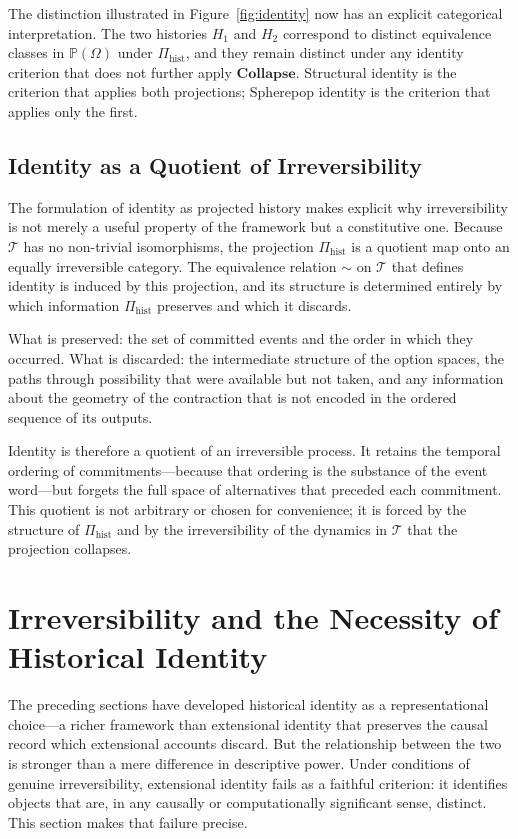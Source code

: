 \documentclass[12pt]{article}
\theoremstyle{plain}
\theoremstyle{definition}
\theoremstyle{remark}
\newcommand{\Collapse}{\mathbf{Collapse}}
\newcommand{\PathCat}{\mathbb{P}(\Omega)}
\begin{document}
The distinction illustrated in Figure~\ref{fig:identity} now has an explicit
categorical interpretation.  The two histories $H_1$ and $H_2$ correspond to
distinct equivalence classes in $\PathCat$ under $\Pi_{\mathrm{hist}}$, and they
remain distinct under any identity criterion that does not further apply
$\Collapse$.  Structural identity is the criterion that applies both projections;
Spherepop identity is the criterion that applies only the first.

\subsection{Identity as a Quotient of Irreversibility}

The formulation of identity as projected history makes explicit why
irreversibility is not merely a useful property of the framework but a
constitutive one.  Because $\mathcal{T}$ has no non-trivial isomorphisms, the
projection $\Pi_{\mathrm{hist}}$ is a quotient map onto an equally irreversible
category.  The equivalence relation $\sim$ on $\mathcal{T}$ that defines
identity is induced by this projection, and its structure is determined entirely
by which information $\Pi_{\mathrm{hist}}$ preserves and which it discards.

What is preserved: the set of committed events and the order in which they
occurred.  What is discarded: the intermediate structure of the option spaces,
the paths through possibility that were available but not taken, and any
information about the geometry of the contraction that is not encoded in the
ordered sequence of its outputs.

Identity is therefore a quotient of an irreversible process.  It retains the
temporal ordering of commitments---because that ordering is the substance of the
event word---but forgets the full space of alternatives that preceded each
commitment.  This quotient is not arbitrary or chosen for convenience; it is
forced by the structure of $\Pi_{\mathrm{hist}}$ and by the irreversibility of
the dynamics in $\mathcal{T}$ that the projection collapses.
\section{Irreversibility and the Necessity of Historical Identity}
\label{sec:necessity}

The preceding sections have developed historical identity as a representational
choice---a richer framework than extensional identity that preserves the causal
record which extensional accounts discard.  But the relationship between the two
is stronger than a mere difference in descriptive power.  Under conditions of
genuine irreversibility, extensional identity fails as a faithful criterion:
it identifies objects that are, in any causally or computationally significant
sense, distinct.  This section makes that failure precise.
\end{document}
